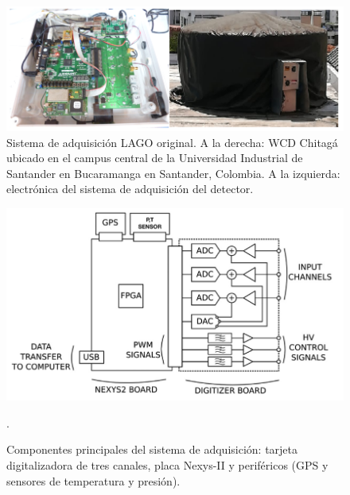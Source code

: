 \begin{figure}[H]
\includegraphics[scale=0.6]{Figs/lagoelectro.PNG} 
\centering
\caption[Sistema de adquisición LAGO original]{Sistema de adquisición LAGO original.
A la derecha: WCD Chitagá ubicado en el campus central de la Universidad Industrial de Santander en Bucaramanga en Santander, Colombia.
A la izquierda: electrónica del sistema de adquisición del detector.}
\label{detec}
\end{figure}

\begin{figure}[H]
\includegraphics[scale=0.6]{Figs/bloquelago.PNG} 
\centering
\caption[Componentes principales del sistema de adquisición]{Componentes principales del sistema de adquisición: tarjeta digitalizadora de tres canales, placa Nexys-II y periféricos (GPS y sensores de temperatura y presión).~\citep{haro2016data}}.
\label{sistema_adquisicion}
\end{figure}


